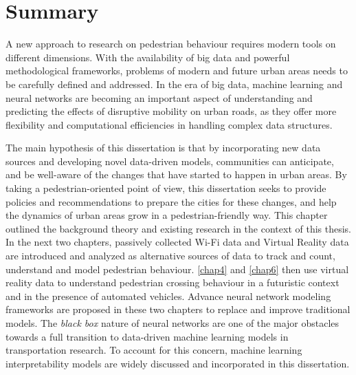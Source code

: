 \section{Summary}
A new approach to research on pedestrian behaviour requires modern tools on different dimensions. With the availability of big data and powerful methodological frameworks, problems of modern and future urban areas needs to be carefully defined and addressed.  In the era of big data, machine learning and neural networks are becoming an important aspect of understanding and predicting the effects of disruptive mobility on urban roads, as they offer more flexibility and computational efficiencies in handling complex data structures.

The main hypothesis of this dissertation is that by incorporating new data sources and developing novel data-driven models, communities can anticipate, and be well-aware of the changes that have started to happen in urban areas. By taking a pedestrian-oriented point of view, this dissertation seeks to provide policies and recommendations to prepare the cities for these changes, and help the dynamics of urban areas grow in a pedestrian-friendly way. 
This chapter outlined the background theory and existing research in the context of this thesis.
In the next two chapters, passively collected Wi-Fi data and Virtual Reality data are introduced and analyzed as alternative sources of data to track and count, understand and model pedestrian behaviour. \cref{chap4} and \cref{chap6} then use virtual reality data to understand pedestrian crossing behaviour in a futuristic context and in the presence of automated vehicles. Advance neural network modeling frameworks are proposed in these two chapters to replace and improve traditional models. The \textit{black box} nature of neural networks are one of the major obstacles towards a full transition to data-driven machine learning models in transportation research. To account for this concern, machine learning interpretability models are widely discussed and incorporated in this dissertation.

